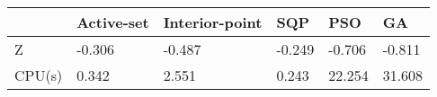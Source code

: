 \begin{tabular}{llllll}
& Active-set & Interior-point & SQP & PSO & GA \\ 
\hline 
Z & -0.306 & -0.487 & -0.249 & -0.706 & -0.811 \\ 
CPU(s) & 0.342 & 2.551 & 0.243 & 22.254 & 31.608 \\ 
\hline 
\end{tabular}